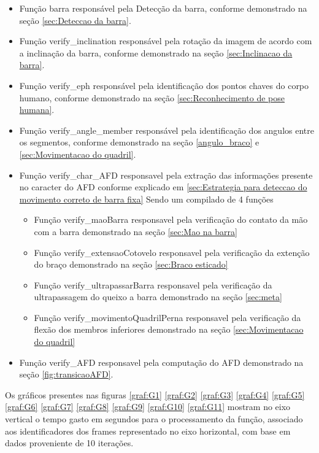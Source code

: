 \begin{itemize}
	\item Função barra responsável pela Detecção da barra, conforme demonstrado na seção \ref{sec:Deteccao da barra}.

	\item Função verify\_inclination responsável pela rotação da imagem de acordo com a inclinação da barra, conforme demonstrado na seção \ref{sec:Inclinacao da barra}.

	\item Função verify\_eph responsável pela identificação dos pontos chaves do corpo humano, conforme demonstrado na seção \ref{sec:Reconhecimento de pose humana}.

	\item Função verify\_angle\_member responsável pela identificação dos angulos entre os segmentos, conforme demonstrado na seção \ref{angulo_braco} e \ref{sec:Movimentacao do quadril}. 

	\item Função verify\_char\_AFD responsavel pela extração das informações presente no caracter do \ac{AFD} conforme explicado em \ref{sec:Estrategia para deteccao do movimento correto de barra fixa} Sendo um compilado de 4 funções 
	
	\begin{itemize}
		
		\item Função verify\_maoBarra responsavel pela verificação do contato da mão com a barra demonstrado na seção \ref{sec:Mao na barra}
		\item Função verify\_extensaoCotovelo responsavel pela verificação da extenção do braço demonstrado na seção \ref{sec:Braco esticado}
		\item Função verify\_ultrapassarBarra responsavel pela verificação da ultrapassagem do queixo a barra demonstrado na seção \ref{sec:meta} 
		\item Função verify\_movimentoQuadrilPerna responsavel pela verificação da flexão dos membros inferiores demonstrado na seção \ref{sec:Movimentacao do quadril}

	\end{itemize}

	\item Função verify\_AFD responsavel pela computação do \ac{AFD} demonstrado na seção \ref{fig:transicaoAFD}.

\end{itemize}

Os gráficos presentes nas figuras \ref{graf:G1} \ref{graf:G2} \ref{graf:G3} \ref{graf:G4} \ref{graf:G5} \ref{graf:G6} \ref{graf:G7} \ref{graf:G8} \ref{graf:G9} \ref{graf:G10} \ref{graf:G11} mostram no eixo vertical o tempo gasto em segundos para o processamento da função, associado aos identificadores dos frames representado no eixo horizontal, com  base em dados proveniente de 10 iterações.




